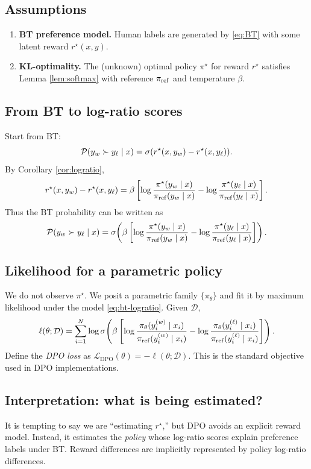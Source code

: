 \subsection{Assumptions}
\begin{enumerate}[leftmargin=1.2cm, itemsep=0.2em]
\item \textbf{BT preference model.} Human labels are generated by \eqref{eq:BT} with some latent reward $r^\star(x,y)$.
\item \textbf{KL-optimality.} The (unknown) optimal policy $\pi^\star$ for reward $r^\star$ satisfies Lemma \ref{lem:softmax} with reference $\pi_{\mathrm{ref}}$ and temperature $\beta$.
\end{enumerate}

\subsection{From BT to log-ratio scores}
Start from BT:
\[
\mathcal{P}(y_w \succ y_\ell\mid x)=\sigma(r^\star(x,y_w)-r^\star(x,y_\ell)).
\]
By Corollary \ref{cor:logratio},
\[
r^\star(x,y_w)-r^\star(x,y_\ell)
=
\beta\left[
\log\frac{\pi^\star(y_w\mid x)}{\pi_{\mathrm{ref}}(y_w\mid x)}
-
\log\frac{\pi^\star(y_\ell\mid x)}{\pi_{\mathrm{ref}}(y_\ell\mid x)}
\right].
\]
Thus the BT probability can be written as
\begin{equation}\label{eq:bt-logratio}
\mathcal{P}(y_w \succ y_\ell\mid x)=
\sigma\!\left(
\beta\left[
\log\frac{\pi^\star(y_w\mid x)}{\pi_{\mathrm{ref}}(y_w\mid x)}
-
\log\frac{\pi^\star(y_\ell\mid x)}{\pi_{\mathrm{ref}}(y_\ell\mid x)}
\right]\right).
\end{equation}

\subsection{Likelihood for a parametric policy}
We do not observe $\pi^\star$. We posit a parametric family $\{\pi_\theta\}$ and fit it by maximum likelihood under the model \eqref{eq:bt-logratio}.
Given $\mathcal{D}$,
\[
\ell(\theta;\mathcal{D})
=
\sum_{i=1}^N
\log
\sigma\!\left(
\beta\left[
\log\frac{\pi_\theta(y_i^{(w)}\mid x_i)}{\pi_{\mathrm{ref}}(y_i^{(w)}\mid x_i)}
-
\log\frac{\pi_\theta(y_i^{(\ell)}\mid x_i)}{\pi_{\mathrm{ref}}(y_i^{(\ell)}\mid x_i)}
\right]\right).
\]
Define the \emph{DPO loss} as $\mathcal{L}_{\mathrm{DPO}}(\theta)=-\ell(\theta;\mathcal{D})$.
This is the standard objective used in DPO implementations.

\subsection{Interpretation: what is being estimated?}
It is tempting to say we are ``estimating $r^\star$,'' but DPO avoids an explicit reward model.
Instead, it estimates the \emph{policy} whose log-ratio scores explain preference labels under BT.
Reward differences are implicitly represented by policy log-ratio differences.

